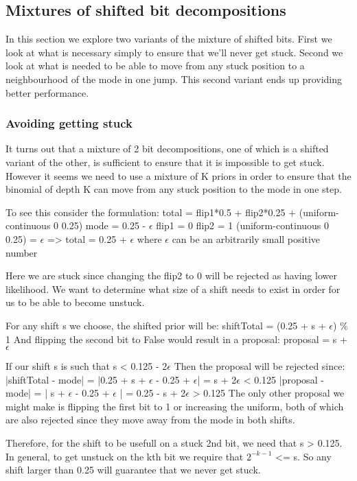 \subsection{Mixtures of shifted bit decompositions}
\label{sect:shifts}
In this section we explore two variants of the mixture of shifted bits. First we look at what is necessary simply to ensure that we'll never get stuck. Second we look at what is needed to be able to move from any stuck position to a neighbourhood of the mode in one jump. This second variant ends up providing better performance.

\subsubsection{Avoiding getting stuck}
\label{sect:stuckMath}

It turns out that a mixture of 2 bit decompositions, one of which is a shifted variant of the other, is sufficient to ensure that it is impossible to get stuck. However it seems we need to use a mixture of K priors in order to ensure that the binomial of depth K can move from any stuck position to the mode in one step. 

To see this consider the formulation:
total = flip1*0.5 + flip2*0.25 + (uniform-continuous 0 0.25)
mode = 0.25 - $\epsilon$
flip1 = 0
flip2 = 1
(uniform-continuous 0 0.25) = $\epsilon$ 
=> total = 0.25 + $\epsilon$
where $\epsilon$ can be an arbitrarily small positive number

Here we are stuck since changing the flip2 to 0 will be rejected as having lower likelihood. We want to determine what size of a shift needs to exist in order for us to be able to become unstuck. 

For any shift s we choose, the shifted prior will be:
shiftTotal = (0.25 + s + $\epsilon$) \% 1 
And flipping the second bit to False would result in a proposal:
proposal = s + $\epsilon$

If our shift s is such that 
s < 0.125 - 2$\epsilon$
Then the proposal will be rejected since:
|shiftTotal - mode| = |0.25 + s + $\epsilon$ - 0.25 + $\epsilon$| = s + 2$\epsilon$ < 0.125
|proposal - mode| = | s + $\epsilon$ - 0.25 + $\epsilon$ | = 0.25 - s + 2$\epsilon$ > 0.125
The only other proposal we might make is flipping the first bit to 1 or increasing the uniform, both of which are also rejected since they move away from the mode in both shifts.

Therefore, for the shift to be usefull on a stuck 2nd bit, we need that s > 0.125. In general, to get unstuck on the kth bit we require that $2^{-k-1}$ <= s. So any shift larger than 0.25 will guarantee that we never get stuck.

